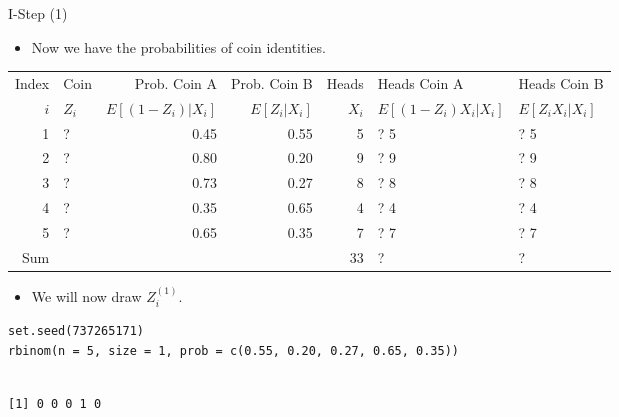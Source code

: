 \documentclass[dvipdfmx,bigger,aspectratio=169]{beamer}
\begin{document}
\begin{frame}[fragile,allowframebreaks,label=,t]{I-Step (1)}
\newpage
\begin{itemize}
\item Now we have the probabilities of coin identities.
\end{itemize}
\footnotesize
\begin{center}
\begin{tabular}{r|l|rr|r|ll|}
Index & Coin & Prob. Coin A & Prob. Coin B & Heads & Heads Coin A & Heads Coin B\\
\(i\) & \(Z_{i}\) & \(E[(1-Z_{i})\vert X_{i}]\) & \(E[Z_{i}\vert X_{i}]\) & \(X_{i}\) & \(E[(1-Z_{i}) X_{i} \vert X_{i}]\) & \(E[Z_{i} X_{i} \vert X_{i}]\)\\
\hline
1 & ? & 0.45 & 0.55 & 5 & ? \texttimes{} 5 & ? \texttimes{} 5\\
2 & ? & 0.80 & 0.20 & 9 & ? \texttimes{} 9 & ? \texttimes{} 9\\
3 & ? & 0.73 & 0.27 & 8 & ? \texttimes{} 8 & ? \texttimes{} 8\\
4 & ? & 0.35 & 0.65 & 4 & ? \texttimes{} 4 & ? \texttimes{} 4\\
5 & ? & 0.65 & 0.35 & 7 & ? \texttimes{} 7 & ? \texttimes{} 7\\
\hline
Sum &  &  &  & 33 & ? & ?\\
\end{tabular}
\end{center}
\normalsize
\begin{itemize}
\item We will now draw \(Z_{i}^{(1)}\).
\end{itemize}
\scriptsize
\begin{verbatim}
set.seed(737265171)
rbinom(n = 5, size = 1, prob = c(0.55, 0.20, 0.27, 0.65, 0.35))
\end{verbatim}

\begin{verbatim}

[1] 0 0 0 1 0
\end{verbatim}


\normalsize


\end{frame}
\end{document}
